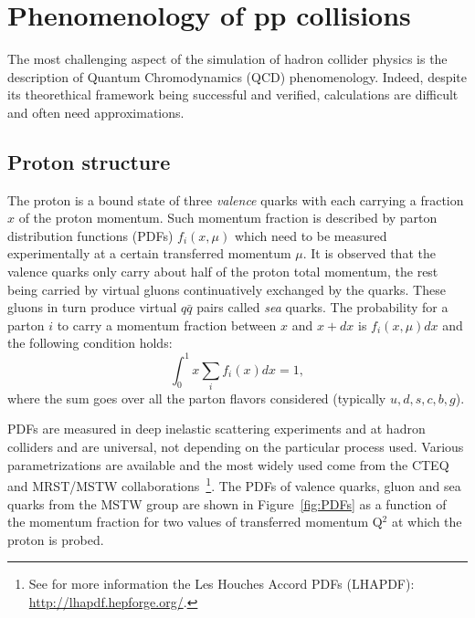 \section{Phenomenology of pp collisions}\label{sec:MCphenomenology}

The most challenging aspect of the simulation of
hadron collider physics is the 
description of Quantum Chromodynamics (QCD) phenomenology. Indeed,
despite its theorethical framework being successful and verified, calculations
are difficult and often need approximations.

\subsection{Proton structure}

The proton is a bound state of three {\it valence} quarks with each carrying
a fraction $x$ of the proton momentum. Such momentum fraction is described
by parton distribution functions (PDFs) $f_i(x,\mu)$ which need to be measured 
experimentally at a certain transferred momentum $\mu$. 
It is observed that the valence quarks only carry about half of the proton total
momentum, the rest being carried by virtual gluons continuatively exchanged 
by the quarks. These gluons in turn produce virtual $q\bar{q}$ pairs called
{\it sea} quarks.
The probability for a parton $i$
to carry a momentum fraction between $x$ and $x+dx$ is $f_i(x,\mu)dx$ and the following
condition holds:
\begin{equation}
\int_0^1 x \sum  \limits_i f_i(x) dx = 1,
\end{equation}
where the sum goes over all the parton flavors considered (typically $u,d,s,c,b,g$).

PDFs are measured in deep inelastic scattering experiments and at hadron colliders and 
are universal, not depending on the particular process used.
Various parametrizations are available and the most widely used come from the
CTEQ and MRST/MSTW collaborations~\cite{mrstcoll,mrst,mstwcoll,mstw}\footnote{See for more information
the Les Houches Accord PDFs (LHAPDF): \url{http://lhapdf.hepforge.org/}.}.
The PDFs of valence quarks, gluon and sea quarks 
from the MSTW group are shown in Figure~\ref{fig:PDFs} as a function of the 
momentum fraction for two values of transferred momentum Q$^2$
at which the proton is probed.

